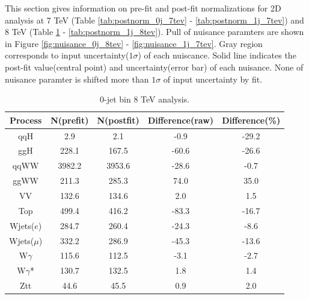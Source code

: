 This section gives information on pre-fit and post-fit normalizations for 2D analysis at
7 TeV (Table \ref{tab:postnorm_0j_7tev} - \ref{tab:postnorm_1j_7tev}) and 
8 TeV (Table \ref{tab:postnorm_0j_8tev} - \ref{tab:postnorm_1j_8tev}).   
Pull of nuisance paramters are shown in Figure \ref{fig:nuisance_0j_8tev} - \ref{fig:nuisance_1j_7tev}.
Gray region corresponds to input uncertainty($1\sigma$) of each nuiscance.
Solid line indicates the post-fit value(central point) and uncertainty(error bar)
of each nuisance. None of nuisance paramter is shifted more than $1\sigma$ of 
input uncertainty by fit.

\begin{table}[ht!]
\begin{center}
\begin{tabular}{c|cc|cc}
\hline \hline
Process     &    N(prefit) &   N(postfit) & Difference(raw) &  Difference(\%)  \\  
\hline \hline
qqH         &        2.9 &        2.1 &       -0.9 &      -29.2        \\
ggH         &      228.1 &      167.5 &      -60.6 &      -26.6        \\
\hline
qqWW        &     3982.2 &     3953.6 &      -28.6 &       -0.7        \\
ggWW        &      211.3 &      285.3 &       74.0 &       35.0        \\
\hline
VV          &      132.6 &      134.6 &        2.0 &        1.5        \\
\hline
Top         &      499.4 &      416.2 &      -83.3 &      -16.7        \\
\hline
Wjets($e$)  &      284.7 &      260.4 &      -24.3 &       -8.6        \\
Wjets($\mu$) &      332.2 &      286.9 &      -45.3 &      -13.6        \\
\hline
W$\gamma$   &      115.6 &      112.5 &       -3.1 &       -2.7        \\
W$\gamma$*  &      130.7 &      132.5 &        1.8 &        1.4        \\
\hline
Ztt         &       44.6 &       45.5 &        0.9 &        2.0        \\
\hline \hline
\end{tabular}
\caption{0-jet bin 8 TeV analysis.}
\label{tab:postnorm_0j_8tev}
\end{center}
\end{table}

